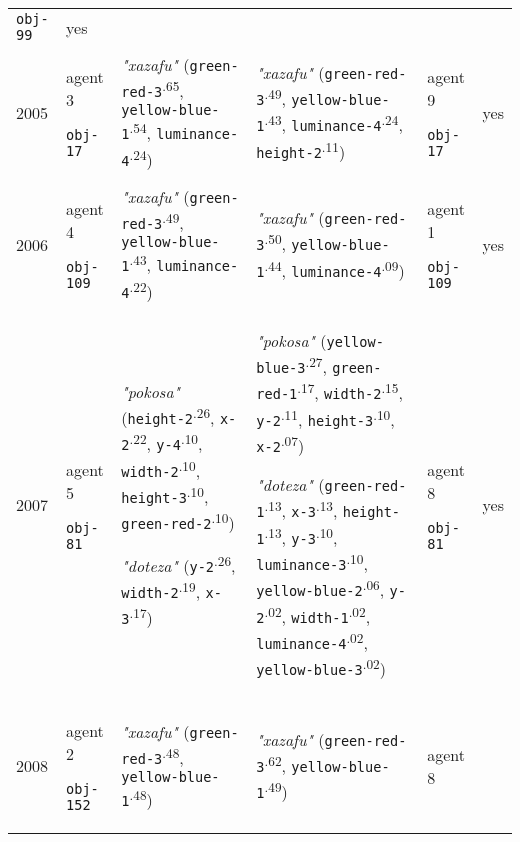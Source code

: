 {\begin{tabular}{p{0.4cm}p{1.4cm}p{7cm}p{7cm}p{1.4cm}p{0.6cm}}
 \texttt{obj-99} & yes \\
2005 & agent 3 

\texttt{obj-17} &\textit{"xazafu"} (\texttt{green-red-3}\textsuperscript{.65}, \texttt{yellow-blue-1}\textsuperscript{.54}, \texttt{luminance-4}\textsuperscript{.24}) & \textit{"xazafu"} (\texttt{green-red-3}\textsuperscript{.49}, \texttt{yellow-blue-1}\textsuperscript{.43}, \texttt{luminance-4}\textsuperscript{.24}, \texttt{height-2}\textsuperscript{.11}) & agent 9 

 \texttt{obj-17} & yes \\
2006 & agent 4 

\texttt{obj-109} &\textit{"xazafu"} (\texttt{green-red-3}\textsuperscript{.49}, \texttt{yellow-blue-1}\textsuperscript{.43}, \texttt{luminance-4}\textsuperscript{.22}) & \textit{"xazafu"} (\texttt{green-red-3}\textsuperscript{.50}, \texttt{yellow-blue-1}\textsuperscript{.44}, \texttt{luminance-4}\textsuperscript{.09}) & agent 1 

 \texttt{obj-109} & yes \\
2007 & agent 5 

\texttt{obj-81} &\textit{"pokosa"} (\texttt{height-2}\textsuperscript{.26}, \texttt{x-2}\textsuperscript{.22}, \texttt{y-4}\textsuperscript{.10}, \texttt{width-2}\textsuperscript{.10}, \texttt{height-3}\textsuperscript{.10}, \texttt{green-red-2}\textsuperscript{.10})

\textit{"doteza"} (\texttt{y-2}\textsuperscript{.26}, \texttt{width-2}\textsuperscript{.19}, \texttt{x-3}\textsuperscript{.17}) & \textit{"pokosa"} (\texttt{yellow-blue-3}\textsuperscript{.27}, \texttt{green-red-1}\textsuperscript{.17}, \texttt{width-2}\textsuperscript{.15}, \texttt{y-2}\textsuperscript{.11}, \texttt{height-3}\textsuperscript{.10}, \texttt{x-2}\textsuperscript{.07})

\textit{"doteza"} (\texttt{green-red-1}\textsuperscript{.13}, \texttt{x-3}\textsuperscript{.13}, \texttt{height-1}\textsuperscript{.13}, \texttt{y-3}\textsuperscript{.10}, \texttt{luminance-3}\textsuperscript{.10}, \texttt{yellow-blue-2}\textsuperscript{.06}, \texttt{y-2}\textsuperscript{.02}, \texttt{width-1}\textsuperscript{.02}, \texttt{luminance-4}\textsuperscript{.02}, \texttt{yellow-blue-3}\textsuperscript{.02}) & agent 8 

 \texttt{obj-81} & yes \\
2008 & agent 2 

\texttt{obj-152} &\textit{"xazafu"} (\texttt{green-red-3}\textsuperscript{.48}, \texttt{yellow-blue-1}\textsuperscript{.48}) & \textit{"xazafu"} (\texttt{green-red-3}\textsuperscript{.62}, \texttt{yellow-blue-1}\textsuperscript{.49}) & agent 8 


\end{tabular}}
